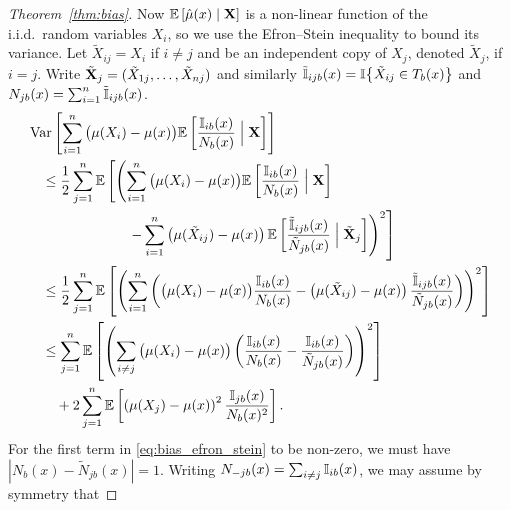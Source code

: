 \begin{proof}[Theorem~\ref{thm:bias}]
  Now $\mathbb{E} \left[ \hat\mu(x) \mid \mathbf{X} \right]$
  is a non-linear function of the i.i.d.\ random variables $X_i$,
  so we use the Efron--Stein inequality
  \citep{efron1981jackknife} to bound its variance.
  Let $\tilde X_{i j} = X_i$ if $i \neq j$ and be an
  independent copy of $X_j$, denoted $\tilde X_j$, if $i = j$.
  Write $\tilde {\mathbf{X}}_j = (\tilde X_{1j}, \ldots, \tilde X_{n j})$
  and similarly
  $\tilde {\mathbb{I}}_{i j b}(x) = \mathbb{I} \big\{ \tilde X_{i j} \in T_b(x) \big\}$
  and $N_{j b}(x) = \sum_{i=1}^{n} \tilde {\mathbb{I}}_{i j b}(x)$.
  \begin{align}
    \nonumber
    &\operatorname{Var} \left[
      \sum_{i=1}^{n}
      \big( \mu(X_i) - \mu(x) \big)
      \mathbb{E} \left[
        \frac{\mathbb{I}_{i b}(x)}{N_b(x)}
        \Bigm| \mathbf{X}
      \right]
    \right] \\
    \nonumber
    &\quad\leq
    \frac{1}{2}
    \sum_{j=1}^{n}
    \mathbb{E} \left[
      \left(
        \sum_{i=1}^{n}
        \big( \mu(X_i) - \mu(x) \big)
        \mathbb{E} \left[
          \frac{\mathbb{I}_{i b}(x)}{N_b(x)}
          \Bigm| \mathbf{X}
        \right]
        \right.\right. \\
        \nonumber
        &\qquad\qquad\qquad\quad\left.\left.
        - \sum_{i=1}^{n}
        \left( \mu(\tilde X_{i j}) - \mu(x) \right)
        \mathbb{E} \left[
          \frac{\tilde {\mathbb{I}}_{i j b}(x)}{\tilde N_{j b}(x)}
          \Bigm| \tilde {\mathbf{X}}_j
        \right]
      \right)^2
    \right] \\
    \nonumber
    &\quad\leq
    \frac{1}{2}
    \sum_{j=1}^{n}
    \mathbb{E} \left[
      \left(
        \sum_{i=1}^{n}
        \left(
          \big( \mu(X_i) - \mu(x) \big)
          \frac{\mathbb{I}_{i b}(x)}{N_b(x)}
          - \left( \mu(\tilde X_{i j}) - \mu(x) \right)
          \frac{\tilde {\mathbb{I}}_{i j b}(x)}{\tilde N_{j b}(x)}
        \right)
      \right)^2
    \right] \\
    \nonumber
    &\quad\leq
    \sum_{j=1}^{n}
    \mathbb{E} \left[
      \left(
        \sum_{i \neq j}
        \big( \mu(X_i) - \mu(x) \big)
        \left(
          \frac{\mathbb{I}_{i b}(x)}{N_b(x)} - \frac{\mathbb{I}_{i b}(x)}{\tilde N_{j b}(x)}
        \right)
      \right)^2
    \right] \\
    \label{eq:bias_efron_stein}
    &\qquad+
    2 \sum_{j=1}^{n}
    \mathbb{E} \left[
      \left( \mu(X_j) - \mu(x) \right)^2
      \frac{\mathbb{I}_{j b}(x)}{N_b(x)^2}
    \right].
  \end{align}
  For the first term in \eqref{eq:bias_efron_stein} to be non-zero,
  we must have $|N_b(x) - \tilde N_{j b}(x)| = 1$.
  Writing $N_{-j b}(x) = \sum_{i \neq j} \mathbb{I}_{i b}(x)$,
  we may assume by symmetry that

\end{proof}
